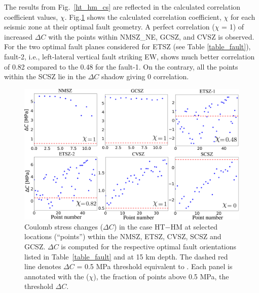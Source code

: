 \documentclass[draft,linenumbers]{agujournal2018}
\begin{document}
The results from Fig.~\ref{ht_hm_cs} are reflected in the calculated correlation coefficient values, $\chi$. Fig.\ref{ht_hm_corr} shows the calculated correlation coefficient, $\chi$ for each seismic zone at their optimal fault geometry. A perfect correlation ($\chi$ = 1) of increased $\Delta C$ with the points within NMSZ\_NE, GCSZ, and CVSZ is observed. For the two optimal fault planes considered for ETSZ (see Table  \ref{table_fault}), fault-2, i.e., left-lateral vertical fault striking EW, shows much better correlation of 0.82 compared to the 0.48 for the fault-1. On the contrary, all the points within the SCSZ lie in the $\Delta C$ shadow giving 0 correlation.
%
\begin{figure}[h!]
    \centering
    \includegraphics[width=0.75\linewidth]{figures/corr_cs_ht_hm.png}
    \caption{ Coulomb stress changes ($\Delta C$) in the case HT$-$HM at selected locations (``points'')  wthin the NMSZ, ETSZ, CVSZ, SCSZ and GCSZ. $\Delta C$ is computed for the respective optimal fault orientations listed in Table~\ref{table_fault} and at 15 km depth. The dashed red line denotes $\Delta C$ = 0.5 MPa threshold equivalent to . Each panel is annotated with the ($\chi$), the fraction of points above 0.5 MPa, the threshold $\Delta C$.}
    \label{ht_hm_corr}
\end{figure}
\end{document}
